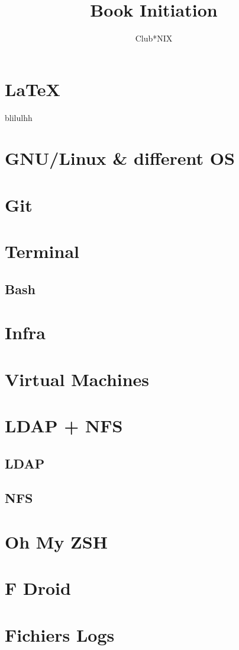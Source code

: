 \documentclass[a4paper]{report}
\title{Book Initiation}
\author{Club*NIX}
\begin{document}
\maketitle

\tableofcontents
\newpage

\chapter{LaTeX}
blilulhh


\chapter{GNU/Linux \& different OS}


\chapter{Git}


\chapter{Terminal}

\section{Bash}


\chapter{Infra}


\chapter{Virtual Machines}


\chapter{LDAP + NFS}
\section{LDAP}

\section{NFS}


\chapter{Oh My ZSH}


\chapter{F Droid}


\chapter{Fichiers Logs}

\end{document}

